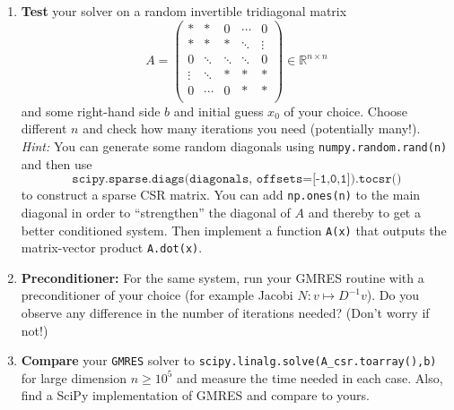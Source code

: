 \begin{enumerate}
	\item \textbf{Test} your solver on a random invertible tridiagonal matrix 
	$$A = \begin{pmatrix}
	* & * 		& 0  &\cdots & 0\\
	* & *		& *  &\ddots &  \vdots\\
	0 & \ddots  		&\ddots   	 &\ddots  & 0 \\
	\vdots    & \ddots  		&*  	 &* & *\\
	0 & \cdots 	&  0  &* &*\\
	\end{pmatrix} \in \mathbb{R}^{n \times n}$$ 
	and some right-hand side $b$ and initial guess $x_0$ of your choice. Choose different $n$ and check how many iterations you need (potentially many!).\\
	\textit{Hint:} You can generate some random diagonals using \texttt{numpy.random.rand(n)} and then use $$\texttt{scipy.sparse.diags(diagonals, offsets=[-1,0,1]).tocsr()}$$ to construct a sparse CSR matrix. You can add \texttt{np.ones(n)} to the main diagonal in order to ``strengthen'' the diagonal of $A$ and thereby to get a better conditioned system. Then implement a function \texttt{A(x)} that outputs the matrix-vector product \texttt{A.dot(x)}. 
%
	\item \textbf{Preconditioner:} For the same system, run your GMRES routine with a preconditioner of your choice (for example Jacobi $N: v \mapsto D^{-1}v$). Do you observe any difference in the number of iterations needed? (Don't worry if not!)
	\item \textbf{Compare} your \texttt{GMRES} solver to \texttt{scipy.linalg.solve(A\_csr.toarray(),b)} for large dimension $n \geq 10^{5}$ and measure the time needed in each case. Also, find a SciPy implementation of GMRES and compare to yours.
\end{enumerate}

